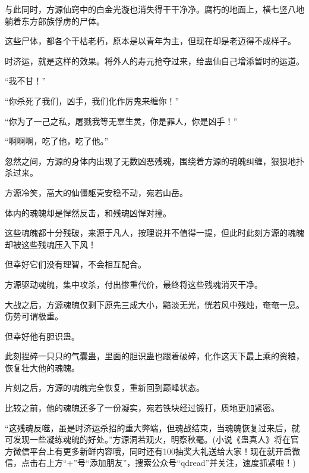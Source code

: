 \begin{this_body}
与此同时，方源仙窍中的白金光漩也消失得干干净净。腐朽的地面上，横七竖八地躺着东方部族俘虏的尸体。

这些尸体，都各个干枯老朽，原本是以青年为主，但现在却是老迈得不成样子。

时济运，就是这样的效果。将外人的寿元抢夺过来，给蛊仙自己增添暂时的运道。

“我不甘！”

“你杀死了我们，凶手，我们化作厉鬼来缠你！”

“你为了一己之私，屠戮我等无辜生灵，你是罪人，你是凶手！”

“啊啊啊，吃了他，吃了他。”

忽然之间，方源的身体内出现了无数凶恶残魂，围绕着方源的魂魄纠缠，狠狠地扑杀过来。

方源冷笑，高大的仙僵躯壳安稳不动，宛若山岳。

体内的魂魄却是悍然反击，和残魂凶悍对撞。

这些魂魄都十分残破，来源于凡人，按理说并不值得一提，但此时此刻方源的魂魄却被这些残魂压入下风！

但幸好它们没有理智，不会相互配合。

方源驱动魂魄，集中攻杀，付出惨重代价，最终将这些残魂消灭干净。

大战之后，方源魂魄仅剩下原先三成大小，黯淡无光，恍若风中残烛，奄奄一息。伤势可谓极重。

但幸好他有胆识蛊。

此刻捏碎一只只的气囊蛊，里面的胆识蛊也跟着破碎，化作这天下最上乘的资粮，恢复壮大他的魂魄。

片刻之后，方源的魂魄完全恢复，重新回到巅峰状态。

比较之前，他的魂魄还多了一份凝实，宛若铁块经过锻打，质地更加紧密。

“这残魂反噬，虽是时济运杀招的重大弊端，但魂战结束，当魂魄恢复过来后，就可发现一些凝练魂魄的好处。”方源洞若观火，明察秋毫。(小说《蛊真人》将在官方微信平台上有更多新鲜内容哦，同时还有100抽奖大礼送给大家！现在就开启微信，点击右上方“+”号“添加朋友”，搜索公众号“qdread”并关注，速度抓紧啦！)

\end{this_body}

